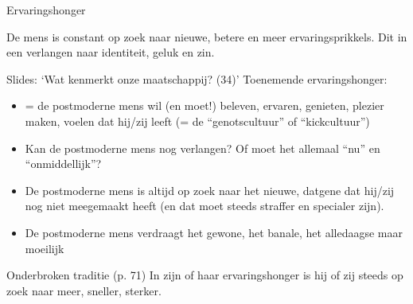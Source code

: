 \documentclass[main.tex]{subfiles}
\begin{document}
\begin{examenvraag}
    \begin{vraag}
        Ervaringshonger
    \end{vraag}

    \begin{antwoord}
        De mens is constant op zoek naar nieuwe, betere  en meer ervaringsprikkels. Dit in een verlangen naar identiteit, geluk en zin.
        \begin{citaat}{Slides: `Wat kenmerkt onze maatschappij? (34)'}
            Toenemende ervaringshonger:
            \begin{itemize}
                \item = de postmoderne mens wil (en moet!) beleven, ervaren, genieten, plezier maken, voelen dat hij/zij leeft (= de ``genotscultuur'' of ``kickcultuur'')
                \item Kan de postmoderne mens nog verlangen? Of moet het allemaal “nu” en “onmiddellijk”?
                \item De postmoderne mens is altijd op zoek naar het nieuwe, datgene dat hij/zij nog niet meegemaakt heeft (en dat moet steeds straffer en specialer zijn).
                \item De postmoderne mens verdraagt het gewone, het banale, het alledaagse maar moeilijk
            \end{itemize}
        \end{citaat}	
        \begin{citaat}{Onderbroken traditie (p. 71)}
            In zijn of haar ervaringshonger is hij of zij steeds op zoek naar meer, sneller, sterker.
        \end{citaat}
    \end{antwoord}
\end{examenvraag}
\end{document}
